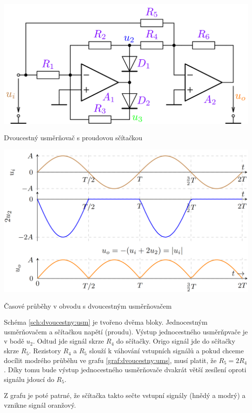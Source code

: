 \documentclass[a4paper,12pt]{article}   %
\begin{document}
\begin{schema}
    \centering
    \includegraphics[width=.6\textwidth]{dvoucestny_usmernovac.PNG}
    \caption{Dvoucestný usměrňovač s proudovou sčítačkou}
    \label{sch:dvoucestny:usm}
\end{schema}

\begin{graf}
    \centering
    \includegraphics[width=.7\textwidth]{dvoucestny_usmernovac-prubeh.PNG}
    \caption{Časové průběhy v obvodu s dvoucestným usměrňovačem}
    \label{graf:dvoucestny:ums}
\end{graf}

Schéma \ref{sch:dvoucestny:usm} je tvořeno dvěma bloky. Jednocestným usměrňovačem a sčítačkou napětí (proudu). Výstup jednocestného usměrňpvače je v bodě $u_2$. Odtud jde signál skrze $R_4$ do sčítačky. Origo signál jde do sčítačky skrze $R_5$. Rezistory $R_4$ a $R_5$ slouží k váhování vstupních signálů a pokud chceme docílit modrého průběhu ve grafu \ref{graf:dvoucestny:ums}, musí platit, že $R_5 = 2R_4$. Díky tomu bude výstup jednocestného usměrňovače dvakrát větší zesílení oproti signálu jdoucí do $R_5$.

Z grafu je poté patrné, že sčítačka takto sečte vstupní signály (hnědý a modrý) a vznikne signál oranžový.





\end{document}
